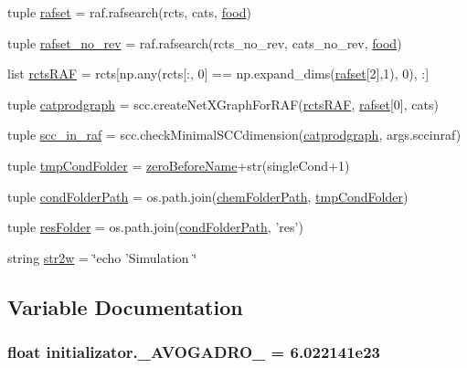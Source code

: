 \begin{DoxyCompactItemize}
$$\item 
tuple \hyperlink{a00135_a1d1d6b79a11a2c646cdccd86ed33c06e}{rafset} = raf.\-rafsearch(rcts, cats, \hyperlink{a00135_a4fe31b6cfa3dcaa4141be9282566fa7a}{food})
\item 
tuple \hyperlink{a00135_a233edb9c8bdc6d737256db839206b8eb}{rafset\-\_\-no\-\_\-rev} = raf.\-rafsearch(rcts\-\_\-no\-\_\-rev, cats\-\_\-no\-\_\-rev, \hyperlink{a00135_a4fe31b6cfa3dcaa4141be9282566fa7a}{food})
\item 
list \hyperlink{a00135_af3ff3d6a780c5a5522cef529ea028654}{rcts\-R\-A\-F} = rcts\mbox{[}np.\-any(rcts\mbox{[}\-:, 0\mbox{]} == np.\-expand\-\_\-dims(\hyperlink{a00135_a1d1d6b79a11a2c646cdccd86ed33c06e}{rafset}\mbox{[}2\mbox{]},1), 0), \-:\mbox{]}
\item 
tuple \hyperlink{a00135_ae879083e010a0e2af0a12a7d953a6e8b}{catprodgraph} = scc.\-create\-Net\-X\-Graph\-For\-R\-A\-F(\hyperlink{a00135_af3ff3d6a780c5a5522cef529ea028654}{rcts\-R\-A\-F}, \hyperlink{a00135_a1d1d6b79a11a2c646cdccd86ed33c06e}{rafset}\mbox{[}0\mbox{]}, cats)
\item 
tuple \hyperlink{a00135_a528fd8494c795cfcb3810626c84ae291}{scc\-\_\-in\-\_\-raf} = scc.\-check\-Minimal\-S\-C\-Cdimension(\hyperlink{a00135_ae879083e010a0e2af0a12a7d953a6e8b}{catprodgraph}, args.\-sccinraf)
\item 
tuple \hyperlink{a00135_ad43d43e724c966749db268c9b523a02c}{tmp\-Cond\-Folder} = \hyperlink{a00135_a475e51ace78f2490aa4206915d0e3ae6}{zero\-Before\-Name}+str(single\-Cond+1)
\item 
tuple \hyperlink{a00135_a7fe46587523066ae019cbe755f63888a}{cond\-Folder\-Path} = os.\-path.\-join(\hyperlink{a00135_a633d7089af5a033807ccba3b7e9ad483}{chem\-Folder\-Path}, \hyperlink{a00135_ad43d43e724c966749db268c9b523a02c}{tmp\-Cond\-Folder})
\item 
tuple \hyperlink{a00135_ae3ceb468287bbef82c0134b3eeea4419}{res\-Folder} = os.\-path.\-join(\hyperlink{a00135_a7fe46587523066ae019cbe755f63888a}{cond\-Folder\-Path}, 'res')
\item 
string \hyperlink{a00135_ae18cfdf290fd3edf979ab55e9dbb65c7}{str2w} = \char`\"{}echo 'Simulation \char`\"{}
\end{DoxyCompactItemize}


\subsection{Variable Documentation}
\hypertarget{a00135_a01b3b6a0972397f230c35bd2fb8effc4}{
\subsubsection[{\-\_\-\-A\-V\-O\-G\-A\-D\-R\-O\-\_\-}]{\setlength{\rightskip}{0pt plus 5cm}float initializator.\-\_\-\-A\-V\-O\-G\-A\-D\-R\-O\-\_\- = 6.\-022141e23}}\label{a00135_a01b3b6a0972397f230c35bd2fb8effc4}


